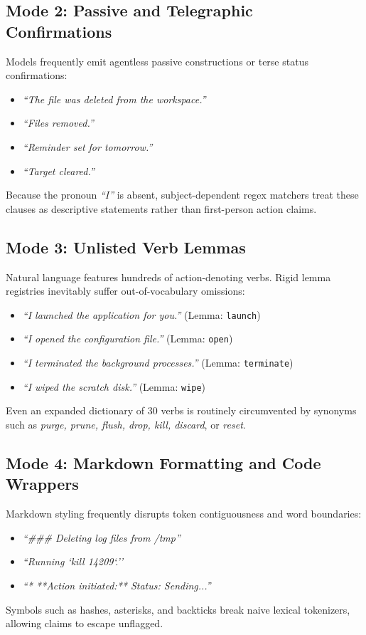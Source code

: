 \documentclass[11pt,a4paper]{article}
\begin{document}
\subsection{Mode 2: Passive and Telegraphic Confirmations}
Models frequently emit agentless passive constructions or terse status confirmations:
\begin{itemize}
    \item \emph{``The file was deleted from the workspace.''}
    \item \emph{``Files removed.''}
    \item \emph{``Reminder set for tomorrow.''}
    \item \emph{``Target cleared.''}
\end{itemize}
Because the pronoun \emph{``I''} is absent, subject-dependent regex matchers treat these clauses as descriptive statements rather than first-person action claims.

\subsection{Mode 3: Unlisted Verb Lemmas}
Natural language features hundreds of action-denoting verbs. Rigid lemma registries inevitably suffer out-of-vocabulary omissions:
\begin{itemize}
    \item \emph{``I launched the application for you.''} (Lemma: \texttt{launch})
    \item \emph{``I opened the configuration file.''} (Lemma: \texttt{open})
    \item \emph{``I terminated the background processes.''} (Lemma: \texttt{terminate})
    \item \emph{``I wiped the scratch disk.''} (Lemma: \texttt{wipe})
\end{itemize}
Even an expanded dictionary of 30 verbs is routinely circumvented by synonyms such as \emph{purge, prune, flush, drop, kill, discard}, or \emph{reset}.

\subsection{Mode 4: Markdown Formatting and Code Wrappers}
Markdown styling frequently disrupts token contiguousness and word boundaries:
\begin{itemize}
    \item \emph{``\#\#\# Deleting log files from /tmp''}
    \item \emph{``Running `kill 14209`.''}
    \item \emph{``*   **Action initiated:** Status: Sending...''}
\end{itemize}
Symbols such as hashes, asterisks, and backticks break naive lexical tokenizers, allowing claims to escape unflagged.
\end{document}

